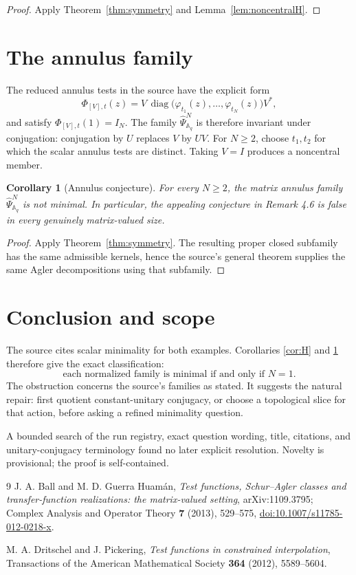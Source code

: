 \documentclass[11pt]{article}
\newtheorem{corollary}[theorem]{Corollary}
\newcommand{\PsiA}{\widehat\Psi_{\mathbb A_q}^N}
\begin{document}
\begin{proof}
Apply Theorem~\ref{thm:symmetry} and Lemma~\ref{lem:noncentralH}.
\end{proof}

\section{The annulus family}

The reduced annulus tests in the source have the explicit form
\[
 \Phi_{[V],t}(z)=
 V\,\operatorname{diag}\bigl(\varphi_{t_1}(z),\ldots,
 \varphi_{t_N}(z)\bigr)V^*,
\]
and satisfy $\Phi_{[V],t}(1)=I_N$.  The family $\PsiA$ is therefore
invariant under conjugation: conjugation by $U$ replaces $V$ by $UV$.
For $N\ge2$, choose $t_1,t_2$ for which the scalar annulus tests are
distinct.  Taking $V=I$ produces a noncentral member.

\begin{corollary}[Annulus conjecture]\label{cor:A}
For every $N\ge2$, the matrix annulus family $\PsiA$ is not minimal.
In particular, the appealing conjecture in Remark 4.6 is false in every
genuinely matrix-valued size.
\end{corollary}

\begin{proof}
Apply Theorem~\ref{thm:symmetry}.  The resulting proper closed subfamily has
the same admissible kernels, hence the source's general theorem supplies
the same Agler decompositions using that subfamily.
\end{proof}

\section{Conclusion and scope}

The source cites scalar minimality for both examples.  Corollaries
\ref{cor:H} and \ref{cor:A} therefore give the exact classification:
\[
 \boxed{\text{each normalized family is minimal if and only if }N=1.}
\]
The obstruction concerns the source's families as stated.  It suggests the
natural repair: first quotient constant-unitary conjugacy, or choose a
topological slice for that action, before asking a refined minimality
question.

A bounded search of the run registry, exact question wording, title,
citations, and unitary-conjugacy terminology found no later explicit
resolution.  Novelty is provisional; the proof is self-contained.

\begin{thebibliography}{9}
J. A. Ball and M. D. Guerra Huam\'an,
\emph{Test functions, Schur--Agler classes and transfer-function
realizations: the matrix-valued setting},
arXiv:1109.3795; Complex Analysis and Operator Theory \textbf{7}
(2013), 529--575,
\href{https://doi.org/10.1007/s11785-012-0218-x}
{doi:10.1007/s11785-012-0218-x}.

M. A. Dritschel and J. Pickering,
\emph{Test functions in constrained interpolation},
Transactions of the American Mathematical Society \textbf{364}
(2012), 5589--5604.
\end{thebibliography}
\end{document}
